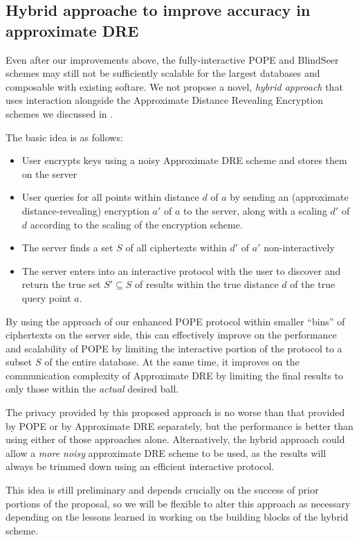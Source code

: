 
\subsection{Hybrid approache to improve accuracy in approximate DRE}

Even after our improvements above, the fully-interactive POPE and
BlindSeer schemes may still not be sufficiently scalable for the largest
databases and composable with existing softare. We not propose a novel,
\emph{hybrid approach} that uses interaction alongside the Approximate
Distance Revealing Encryption schemes we discussed in .

The basic idea is as follows:
\begin{itemize}\setlength{\itemsep}{0em}
  \item User encrypts keys using a noisy Approximate DRE scheme and
  stores them on the server
  \item User queries for all points within distance $d$ of $a$ by
    sending an (approximate distance-revealing) encryption $a'$ of $a$ to the
    server, along with a scaling $d'$ of $d$ according to the scaling of
    the encryption scheme.
  \item The server finds a set $S$ of all ciphertexts within $d'$ of $a'$
    non-interactively
  \item The server enters into an interactive protocol with the user to
    discover and return
    the true set $S' \subseteq S$ of results within the true
    distance $d$ of the true query point $a$.
\end{itemize}

By using the approach of our enhanced POPE protocol within smaller
``bins'' of ciphertexts on the server side, this can effectively
improve on the performance and scalability of POPE by limiting the
interactive portion of the protocol to a subset $S$ of the entire
database. At the same time, it improves on the communication complexity
of Approximate DRE by limiting the final results to only those within
the \emph{actual} desired ball.

The privacy provided by this proposed approach is no worse than that
provided by POPE or by Approximate DRE separately, but the performance
is better than using either of those approaches alone. Alternatively,
the hybrid approach could allow a \emph{more noisy} approximate DRE
scheme to be used, as the results will always be trimmed down using an
efficient interactive protocol.

This idea is still preliminary and depends crucially on the success of
prior portions of the proposal, so we will be flexible to alter this
approach as necessary depending on the lessons learned in working on the
building blocks of the hybrid scheme.
